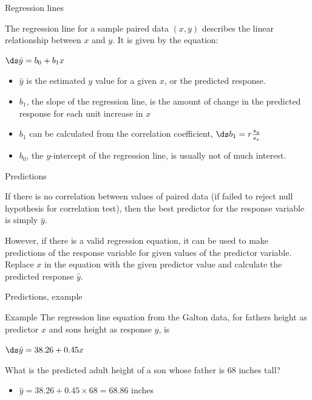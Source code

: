 \documentclass[xcolor=table, handout]{beamer}
\begin{document}
\begin{frame}{Regression lines}
\begin{block}{}
\large
The regression line for a sample paired data $(x,y)$ describes the linear relationship between $x$ and $y$. It is given by the equation:\\
\medskip
{\centering \Large
$\ds \hat y = b_0 + b_1 x$
\par}
\smallskip
\begin{itemize}
\pause\item $\hat y$ is the estimated $y$ value for a given $x$, or the predicted response.
\pause\item $b_1$, the slope of the regression line, is the amount of change in the predicted response for each unit increase in $x$
\pause\item $b_1$ can be calculated from the correlation coefficient, $\ds b_1 = r \frac{s_y}{s_x}$
\pause\item $b_0$, the $y$-intercept of the regression line, is usually not of much interest.
\end{itemize}
\end{block}
\end{frame}

\begin{frame}{Predictions}
\begin{block}{}
\large
If there is no correlation between values of paired data (if failed to reject null hypothesis for correlation test), then the best predictor for the response variable is simply $\bar y$.
\end{block}

\pause
\begin{block}{}
\large
However, if there is a valid regression equation, it can be used to make predictions of the response variable for given values of the predictor variable. Replace $x$ in the equation with the given predictor value and calculate the predicted response $\hat y$.
\end{block}
\end{frame}

\begin{frame}{Predictions, example}
\begin{exampleblock}{Example}
\large
The regression line equation from the Galton data, for fathers height as predictor $x$ and sons height as response $y$, is \\
\smallskip
{\centering
$\ds \hat y = 38.26 + 0.45 x$
\par}
\smallskip
What is the predicted adult height of a son whose father is 68 inches tall?
\begin{itemize}
\pause\item $\hat y = 38.26 + 0.45 \times 68 = 68.86$ inches
\end{itemize}
\end{exampleblock}
\end{frame}
\end{document}
